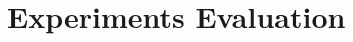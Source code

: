 \documentclass[sigconf]{acmart}
\begin{document}

\section{Experiments Evaluation} \label{sec:experiments}
\end{document}
